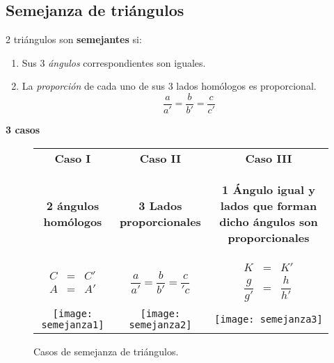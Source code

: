 \newpage
\subsection{Semejanza de triángulos}

2 triángulos son \textbf{semejantes} si:
\begin{enumerate}[label=\alph*)]
	\item Sus 3 \textit{ángulos} correspondientes son iguales.
	\item La \textit{proporción} de cada uno de sus 3 lados homólogos 
	 es proporcional.\\
		$$\dfrac{a}{a'} = \dfrac{b}{b'} = \dfrac{c}{c'}$$
\end{enumerate}

\textbf{\large3 casos}

\begin{figure*}[h!]
\def\arraystretch{1.5}%
\caption[semejanza]{Casos de semejanza de triángulos. }
\label{semejanza}
\begin{tabular}{c  c  c }
	\textbf{Caso I} & 
	\textbf{Caso II} & 
	\textbf{Caso III}                       
	\\
	\textbf{2 ángulos homólogos} & 
	\textbf{3 Lados proporcionales} & 
	\parbox{5cm}{ \begin{center}
		\textbf{1 Ángulo igual y lados que forman dicho ángulos son proporcionales}                     
	\end{center}}  
	\\
	$\begin{array} {lcl} 
		C & = & C' \\ 
		A & = & A' 
	\end{array}$ &
	$\dfrac{a}{a'} = \dfrac{b}{b'} = \dfrac{c}{'c} $ &
	$\begin{array} {lcl} 
		K & = & K' \\ 
		\dfrac{g}{g'} &=& \dfrac{h}{h'}
	\end{array}$
	\\
	\texttt{[image: semejanza1]} & 
	\texttt{[image: semejanza2]}  & 
	\texttt{[image: semejanza3]} 
\end{tabular}
\end{figure*}

